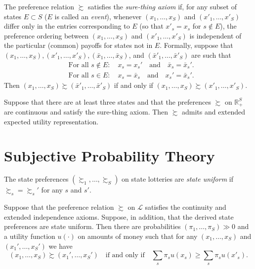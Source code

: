 \begin{defn}
    The preference relation $\succsim$ satisfies the \emph{sure-thing axiom} if, for any subset of states $E \subset S$ ($E$ is called an \emph{event}), whenever $(x_1, \dots, x_S)$ and $(x'_1, \dots, x'_S)$ differ only in the entries corresponding to $E$ (so that $x'_s = x_s$ for $s \notin E$), the preference ordering between $(x_1, \dots, x_S)$ and $(x'_1, \dots, x'_S)$ is independent of the particular (common) payoffs for states not in $E$. Formally, suppose that $(x_1, \dots, x_S), (x'_1, \dots, x'_S), (\bar{x}_1, \dots, \bar{x}_S)$, and $(\bar{x}'_1, \dots, \bar{x}'_S)$ are such that
    \begin{align*}
        &\text{For all } s \notin E: \quad x_s = x_s' \quad \text{and} \quad \bar{x}_s = \bar{x}_s'. \\
        &\text{For all } s \in E: \quad x_s = \bar{x}_s \quad \text{and} \quad x_s' = \bar{x}_s'.
    \end{align*}
    Then $(x_1, \dots, x_S) \succsim (\bar{x}'_1, \dots, \bar{x}'_S)$ if and only if $(x_1, \dots, x_S) \succsim (x'_1, \dots, x'_S)$.
\end{defn}

\begin{prop}
    Suppose that there are at least three states and that the preferences $\succsim$ on $\mathbb{R}^{S}_+$ are continuous and satisfy the sure-thing axiom. Then $\succsim$ admits and extended expected utility representation.
\end{prop}


\section{Subjective Probability Theory}

\begin{defn}
    The state preferences $(\succsim_1, \dots, \succsim_S)$ on state lotteries are \emph{state uniform} if $\succsim_s = \succsim_s'$ for any $s$ and $s'$.
\end{defn}

\begin{prop}
    Suppose that the preference relation $\succsim$ on $\mathscr{L}$ satisfies the continuity and extended independence axioms. Suppose, in addition, that the derived state preferences are state uniform. Then there are probabilities $(\pi_1, \dots, \pi_S) \gg 0$ and a utility function $u(\cdot)$ on amounts of money such that for any $(x_1, \dots, x_S)$ and $(x_1', \dots, x_S')$ we have
    \begin{equation*}
        (x_1, \dots, x_S) \succsim (x_1', \dots, x_S') \quad \text{if and only if} \quad \sum_s \pi_s u(x_s) \geq \sum_s \pi_s u(x'_s).
    \end{equation*}
\end{prop}
